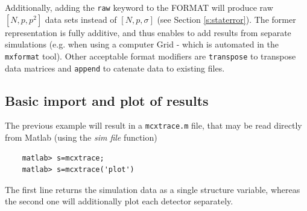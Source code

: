 
Additionally, adding the \texttt{raw} keyword to the FORMAT will produce raw $[N, p, p^2]$ data sets instead of $[N, p, \sigma]$ (see Section \ref{s:staterror}). The former representation is fully additive, and thus enables to add results from separate simulations (e.g. when using a computer Grid - which is automated in the \verb+mxformat+ tool). Other acceptable format modifiers are \verb+transpose+ to transpose data matrices and \verb+append+ to catenate data to existing files.

\subsection{Basic import and plot of results}
\label{s:run-format}
The previous example will result in a \verb+mcxtrace.m+ file, that may be read directly from Matlab (using the \textit{sim file} function)
\begin{verbatim}
    matlab> s=mcxtrace;
    matlab> s=mcxtrace('plot')
\end{verbatim} 
The first line returns the simulation data as a single structure variable, whereas the second one will additionally plot each detector separately.

